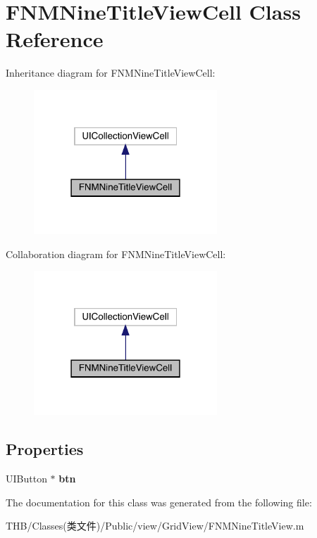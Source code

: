 \hypertarget{interface_f_n_m_nine_title_view_cell}{}\section{F\+N\+M\+Nine\+Title\+View\+Cell Class Reference}
\label{interface_f_n_m_nine_title_view_cell}


Inheritance diagram for F\+N\+M\+Nine\+Title\+View\+Cell\+:\nopagebreak
\begin{figure}[H]
\begin{center}
\leavevmode
\includegraphics[width=195pt]{interface_f_n_m_nine_title_view_cell__inherit__graph}
\end{center}
\end{figure}


Collaboration diagram for F\+N\+M\+Nine\+Title\+View\+Cell\+:\nopagebreak
\begin{figure}[H]
\begin{center}
\leavevmode
\includegraphics[width=195pt]{interface_f_n_m_nine_title_view_cell__coll__graph}
\end{center}
\end{figure}
\subsection*{Properties}
\begin{DoxyCompactItemize}
\item 
\mbox{\label{interface_f_n_m_nine_title_view_cell_a60a245d6d9bb25718ee3b1c609a27f98}} 
U\+I\+Button $\ast$ {\bfseries btn}
\end{DoxyCompactItemize}


The documentation for this class was generated from the following file\+:\begin{DoxyCompactItemize}
\item 
T\+H\+B/\+Classes(类文件)/\+Public/view/\+Grid\+View/F\+N\+M\+Nine\+Title\+View.\+m\end{DoxyCompactItemize}
